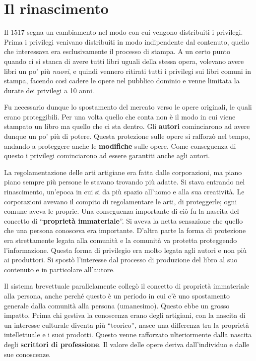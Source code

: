 \section{Il rinascimento}

Il 1517 segna un cambiamento nel modo con cui vengono distribuiti i privilegi. Prima i privilegi venivano distribuiti in modo indipendente dal contenuto, quello che interessava era esclusivamente il processo di stampa. A un certo punto quando ci si stanca di avere tutti libri uguali della stessa opera, volevano avere libri un po' più \textit{nuovi}, e quindi vennero ritirati tutti i privilegi sui libri comuni in stampa, facendo così cadere le opere nel pubblico dominio e venne limitata la durate dei privilegi a 10 anni.

Fu necessario dunque lo spostamento del mercato verso le opere originali, le quali erano proteggibili. Per una volta quello che conta non è il modo in cui viene stampato un libro ma quello che ci sta dentro. Gli \textbf{autori} cominciarono ad avere dunque un po' più di potere. Questa protezione sulle opere si rafforzò nel tempo, andando a proteggere anche le \textbf{modifiche} sulle opere. Come conseguenza di questo i privilegi cominciarono ad essere garantiti anche agli autori.  

La regolamentazione delle arti artigiane era fatta dalle corporazioni, ma piano piano sempre più persone le stavano trovando più adatte. Si stava entrando nel rinascimento, un'epoca in cui si da più spazio all'uomo e alla sua creatività. Le corporazioni avevano il compito di regolamentare le arti, di proteggerle; ogni comune aveva le proprie. Una conseguenza importante di ciò fu la nascita del concetto di ``\textbf{proprietà immateriale}''. Si aveva la netta sensazione che quello che una persona conosceva era importante. D'altra parte la forma di protezione era strettamente legata alla comunità e la comunità va protetta proteggendo l'informazione. Questa forma di privilegio era molto legata agli autori e non più ai produttori. Si spostò l'interesse dal processo di produzione del libro al suo contenuto e in particolare all'autore.

Il sistema brevettuale parallelamente collegò il concetto di proprietà immateriale alla persona, anche perché questo è un periodo in cui c'è uno spostamento generale dalla comunità alla persona (umanesimo). Questo ebbe un grosso impatto. Prima chi gestiva la conoscenza erano degli artigiani, con la nascita di un interesse culturale diventa più ``teorico'', nasce una differenza tra la proprietà intellettuale e i suoi prodotti. Questo venne rafforzato ulteriormente dalla nascita degli \textbf{scrittori di professione}. Il valore delle opere deriva dall'individuo e dalle sue conoscenze.


